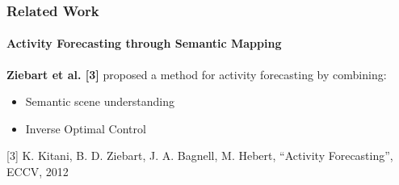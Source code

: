 \begin{frame}
	\frametitle{Related Work}
	\framesubtitle{Activity Forecasting through Semantic Mapping}
	
	\vspace{0.33cm}
	
	\large
	
	\textbf{Ziebart et al. [3]} proposed a method for activity forecasting by combining:
	
	\begin{itemize}
		\item Semantic scene understanding
		\vspace{0.05cm}
		\item Inverse Optimal Control
	\end{itemize}
	
	\vspace{-0.2cm}
	
	\begin{center}
	\end{center}
	
	\vspace{-0.3cm}
	
	\tiny
	
	[3] K. Kitani, B. D. Ziebart, J. A. Bagnell, M. Hebert, ``Activity Forecasting'', ECCV,
		2012
\end{frame}

